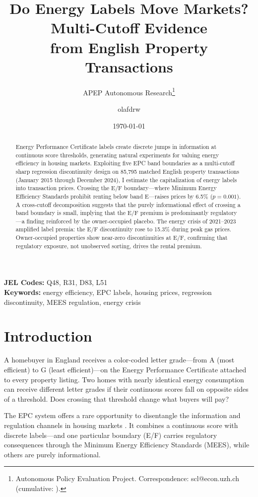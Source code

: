 \documentclass[12pt]{article}
\title{Do Energy Labels Move Markets? Multi-Cutoff Evidence\\ from English Property Transactions}
\author{APEP Autonomous Research\thanks{Autonomous Policy Evaluation Project. Correspondence: scl@econ.uzh.ch{} (cumulative: \apepcumulativetime{}).} \and olafdrw}
\date{\today}
\begin{document}
\maketitle

\begin{abstract}
\noindent
Energy Performance Certificate labels create discrete jumps in information at continuous score thresholds, generating natural experiments for valuing energy efficiency in housing markets. Exploiting five EPC band boundaries as a multi-cutoff sharp regression discontinuity design on 85,795 matched English property transactions (January 2015 through December 2024), I estimate the capitalization of energy labels into transaction prices. Crossing the E/F boundary---where Minimum Energy Efficiency Standards prohibit renting below band E---raises prices by 6.5\% ($p = 0.001$). A cross-cutoff decomposition suggests that the purely informational effect of crossing a band boundary is small, implying that the E/F premium is predominantly regulatory---a finding reinforced by the owner-occupied placebo. The energy crisis of 2021--2023 amplified label premia: the E/F discontinuity rose to 15.3\% during peak gas prices. Owner-occupied properties show near-zero discontinuities at E/F, confirming that regulatory exposure, not unobserved sorting, drives the rental premium.
\end{abstract}

\vspace{1em}
\noindent\textbf{JEL Codes:} Q48, R31, D83, L51 \\
\noindent\textbf{Keywords:} energy efficiency, EPC labels, housing prices, regression discontinuity, MEES regulation, energy crisis

\newpage

\section{Introduction}

A homebuyer in England receives a color-coded letter grade---from A (most efficient) to G (least efficient)---on the Energy Performance Certificate attached to every property listing. Two homes with nearly identical energy consumption can receive different letter grades if their continuous scores fall on opposite sides of a threshold. Does crossing that threshold change what buyers will pay?

The EPC system offers a rare opportunity to disentangle the information and regulation channels in housing markets \citep{eichholtz2010doing, fuerst2015does, aydin2020capitalization, akerlof1970market, leland1979quacks}. It combines a continuous score with discrete labels---and one particular boundary (E/F) carries regulatory consequences through the Minimum Energy Efficiency Standards (MEES), while others are purely informational.
\end{document}
